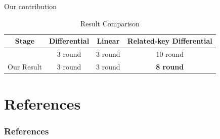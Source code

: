 \documentclass{beamer}
\begin{document}
\begin{frame}{Our contribution}


\begin{table}[ht]
    \footnotesize
    \centering
    \begin{tabular}{|c|c|c|c|}
        \hline
        \textbf{Stage} & \textbf{Differential} & \textbf{Linear}  & \textbf{Related-key Differential}  \\
        \hline
        \cite{karakocc2013itubee}  & 3 round & 3 round & 10 round \\
        \hline
        Our Result & 3 round & 3 round & \textbf{8 round }  \\  
        \hline
    \end{tabular}
    \caption{Result Comparison}
    \label{tab:RelatedKeyDif}
\end{table}


\end{frame}

\section{References}

\begin{frame}
\frametitle{References}

\printbibliography

\end{frame}
\end{document}
